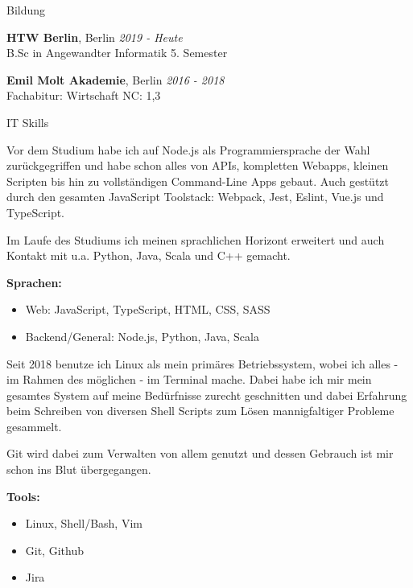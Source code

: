 \documentclass{cv}
\begin{document}
\begin{rSection}{Bildung}

{\bf HTW Berlin}, Berlin \hfill {\em 2019 - Heute}\\
B.Sc in Angewandter Informatik
\hfill 5. Semester

\smallskip

{\bf Emil Molt Akademie}, Berlin \hfill {\em 2016 - 2018}\\
Fachabitur: Wirtschaft
\hfill NC: 1,3

\end{rSection}

\begin{rSection}{IT Skills}

  \newcommand\skillWidth{0.48}
  \begin{minipage}[t]{\skillWidth\linewidth}

Vor dem Studium habe ich auf Node.js als Programmiersprache der Wahl
zurückgegriffen und habe schon alles von APIs, kompletten Webapps, kleinen
Scripten bis hin zu vollständigen Command-Line Apps gebaut. Auch gestützt durch
den gesamten JavaScript Toolstack: Webpack, Jest, Eslint, Vue.js und TypeScript.

    \medskip

Im Laufe des Studiums ich meinen sprachlichen Horizont erweitert und auch
Kontakt mit u.a. Python, Java, Scala und C++ gemacht.

    \medskip

    \textbf{Sprachen:}
    \begin{itemize}
      \item Web: JavaScript, TypeScript, HTML, CSS, SASS
      \item Backend/General: Node.js, Python, Java, Scala
    \end{itemize}
  \end{minipage}
  \hfill
  \begin{minipage}[t]{\skillWidth\linewidth}

Seit 2018 benutze ich Linux als mein primäres Betriebssystem, wobei ich
alles - im Rahmen des möglichen - im Terminal mache. Dabei habe ich mir mein
gesamtes System auf meine Bedürfnisse zurecht geschnitten und dabei Erfahrung
beim Schreiben von diversen Shell Scripts zum Lösen mannigfaltiger Probleme
gesammelt.

Git wird dabei zum Verwalten von allem genutzt und dessen Gebrauch
ist mir schon ins Blut übergegangen.

    \medskip

    \textbf{Tools:}
    \begin{itemize}
      \item Linux, Shell/Bash, Vim
      \item Git, Github
      \item Jira
    \end{itemize}


\end{minipage}
\end{rSection}
\end{document}
